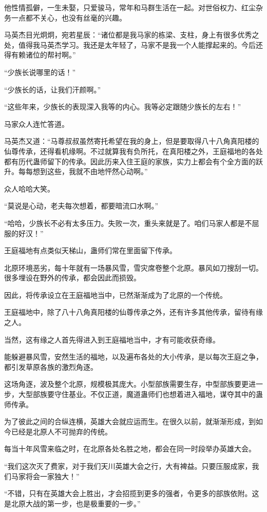 \begin{this_body}
他性情孤僻，一生未娶，只爱骏马，常年和马群生活在一起。对世俗权力、红尘杂务一点都不关心，也没有丝毫的兴趣。

马英杰目光炯炯，宛若星辰：“诸位都是我马家的栋梁、支柱，身上有很多优秀之处，值得我马英杰学习。我还是太年轻了，马家不是我一个人能撑起来的。今后还得有赖诸位的帮衬啊。”

“少族长说哪里的话！”

“少族长的话，让我们汗颜啊。”

“这些年来，少族长的表现深入我等的内心。我等必定跟随少族长的左右！”

马家众人连忙答道。

马英杰又道：“马尊叔叔虽然寄托希望在我的身上，但是要取得八十八角真阳楼的仙尊传承，还得看机缘啊。不过就算我有负所托，在真阳楼之外，王庭福地的各处都有历代蛊师留下的传承。因此历来入住王庭的家族，实力上都会有个全方面的跃升。每每想到这些，我就不由地怦然心动啊。”

众人哈哈大笑。

“莫说是心动，老夫每次想着，都要暗流口水啊。”

“哈哈，少族长不必有太多压力。失败一次，重头来就是了。咱们马家人都是不屈服的好汉！”

王庭福地有点类似天梯山，蛊师们常在里面留下传承。

北原环境恶劣，每十年就有一场暴风雪，雪灾席卷整个北原。暴风如刀搜刮一切。很多埋设在野外的传承，都会因此而损毁。

因此，将传承设立在王庭福地当中，已然渐渐成为了北原的一个传统。

王庭福地中，除了八十八角真阳楼的仙尊传承之外，还有许多其他传承，留待有缘之人。

当然，这有缘之人首先得进入到王庭福地当中，才有可能收获奇缘。

能躲避暴风雪，安然生活的福地，以及遍布各处的大小传承，是以每次王庭之争，都引发草原各族的激烈角逐。

这场角逐，波及整个北原，规模极其庞大。小型部族需要生存，中型部族要更进一步，大型部族要守住基业。不仅正道，魔道蛊师们也想着进入福地，谋夺其中的蛊师传承。

为了彼此之间的合纵连横，英雄大会就应运而生。在很久以前，就渐渐形成，到如今已经是北原人不可抛弃的传统。

每当十年风雪来临之时，在北原各处名胜之地，都会在同一时段举办英雄大会。

“我们这次灭了费家，对于我们天川英雄大会之行，大有裨益。只要压服成家，我们马家将会一家独大！”

“不错，只有在英雄大会上胜出，才会招揽到更多的强者，令更多的部族依附。这是北原大战的第一步，也是极重要的一步。”


\end{this_body}

